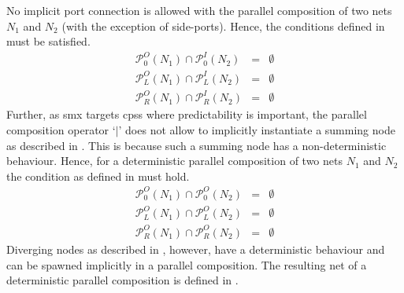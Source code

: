 No implicit port connection is allowed with the parallel composition of two nets $N_1$ and $N_2$ (with the exception of side-ports).
Hence, the conditions defined in \Equ{\ref{eq_smx_p_no_con}} must be satisfied.
\begin{eqnarray}
    \mathcal{P}_0^O(N_1) \cap \mathcal{P}_0^I(N_2) & = & \emptyset \nonumber \\
    \mathcal{P}_L^O(N_1) \cap \mathcal{P}_L^I(N_2) & = & \emptyset \nonumber \\
    \mathcal{P}_R^O(N_1) \cap \mathcal{P}_R^I(N_2) & = & \emptyset
    \label{eq_smx_p_no_con}
\end{eqnarray}
Further, as \gls*{smx} targets \glspl{cps} where predictability is important, the parallel composition operator `$|$' does not allow to implicitly instantiate a summing node as described in \Sect{\ref{sect_smx_box_implicit_flow}}.
This is because such a summing node has a non-deterministic behaviour.
Hence, for a deterministic parallel composition of two nets $N_1$ and $N_2$ the condition as defined in \Equ{\ref{eq_smx_p_non_det}} must hold.
\begin{eqnarray}
    \mathcal{P}_0^O(N_1) \cap \mathcal{P}_0^O(N_2) & = & \emptyset \nonumber \\
    \mathcal{P}_L^O(N_1) \cap \mathcal{P}_L^O(N_2) & = & \emptyset \nonumber \\
    \mathcal{P}_R^O(N_1) \cap \mathcal{P}_R^O(N_2) & = & \emptyset
    \label{eq_smx_p_non_det}
\end{eqnarray}
Diverging nodes as described in \Sect{\ref{sect_smx_box_implicit_flow}}, however, have a deterministic behaviour and can be spawned implicitly in a parallel composition.
The resulting net of a deterministic parallel composition is defined in \Def{\ref{def_smx_pd}}.

